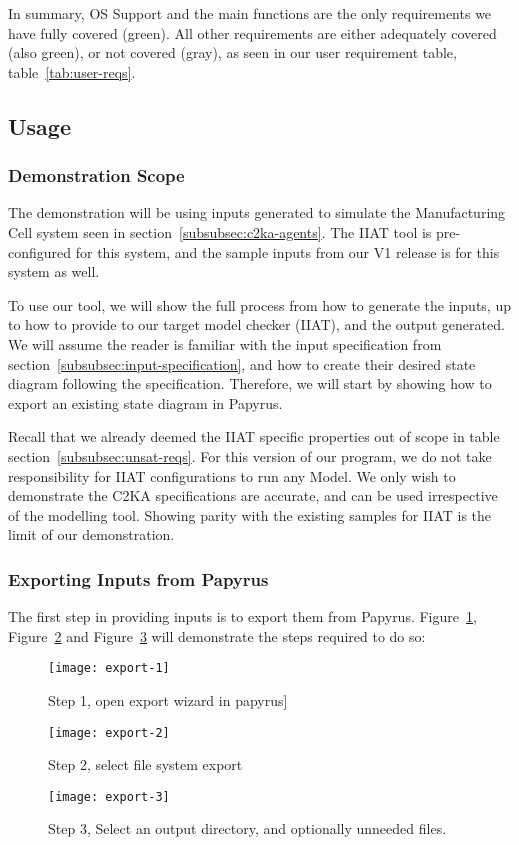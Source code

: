 In summary, OS Support and the main functions are the only requirements we have fully covered (green).
All other requirements are either adequately covered (also green), or not covered (gray),
as seen in our user requirement table, table~\ref{tab:user-reqs}.


\subsection{Usage}\label{subsec:usage}
\subsubsection{Demonstration Scope}\label{subsubsec:scope}
The demonstration will be using inputs generated to simulate the Manufacturing Cell system seen in section~\ref{subsubsec:c2ka-agents}.
The IIAT tool is pre-configured for this system, and the sample inputs from our V1 release is for this system as well.

To use our tool, we will show the full process from how to generate the inputs,
up to how to provide to our target model checker (IIAT), and the output generated.
We will assume the reader is familiar with the input specification from section~\ref{subsubsec:input-specification},
and how to create their desired state diagram following the specification.
Therefore, we will start by showing how to export an existing state diagram in Papyrus.

Recall that we already deemed the IIAT specific properties out of scope in table section~\ref{subsubsec:unsat-reqs}.
For this version of our program, we do not take responsibility for IIAT configurations to run any Model.
We only wish to demonstrate the C2KA specifications are accurate, and can be used irrespective of the modelling tool.
Showing parity with the existing samples for IIAT is the limit of our demonstration.


\subsubsection{Exporting Inputs from Papyrus}
The first step in providing inputs is to export them from Papyrus.
Figure~\ref{fig:export-1}, Figure~\ref{fig:export-2} and Figure~\ref{fig:export-3} will demonstrate the steps required to do so:
\begin{figure}[h]
    \centering
    \texttt{[image: export-1]}
    \caption{Step 1, open export wizard in papyrus]}
    \label{fig:export-1}
\end{figure}
\begin{figure}[h]
    \centering
    \texttt{[image: export-2]}
    \caption{Step 2, select file system export}
    \label{fig:export-2}
\end{figure}
\begin{figure}[h]
    \centering
    \texttt{[image: export-3]}
    \caption{Step 3, Select an output directory, and optionally unneeded files.}
    \label{fig:export-3}
\end{figure}

